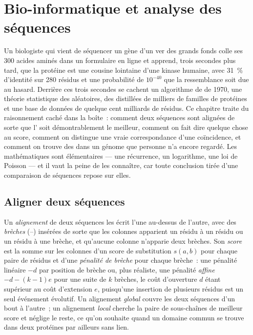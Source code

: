 \chapter{Bio-informatique et analyse des séquences}\label{ch:b3:bioinformatics}

Un biologiste qui vient de séquencer un gène d'un ver des grands fonds
colle ses \num{300} acides aminés dans un formulaire en ligne et
apprend, trois secondes plus tard, que la protéine est une cousine
lointaine d'une kinase humaine, avec \qty{31}{\%} d'identité sur
\num{280} résidus et une probabilité de $10^{-40}$ que la ressemblance
soit due au hasard. Derrière ces trois secondes se cachent un
algorithme de  de 1970, une théorie statistique
des  aléatoires, des  distillées de
milliers de familles de protéines et une base de données de quelque
cent milliards de résidus. Ce chapitre traite du raisonnement caché
dans la boîte~: comment deux séquences sont alignées de sorte que
l' soit démontrablement le meilleur, comment on fait dire
quelque chose au score, comment on distingue une vraie correspondance
d'une coïncidence, et comment on trouve des  dans un génome que
personne n'a encore regardé. Les mathématiques sont élémentaires ---
une récurrence, un logarithme, une loi de Poisson --- et il vaut la
peine de les connaître, car toute conclusion tirée d'une comparaison de
séquences repose sur elles.

\section{Aligner deux séquences}

\begin{definition}\label{def:b3:bioinformatics:alignment}
Un \emph{alignement} de deux séquences les écrit l'une au-dessus de
l'autre, avec des \emph{brèches} (--) insérées de sorte que les
colonnes apparient un résidu à un résidu ou un résidu à une brèche, et
qu'aucune colonne n'apparie deux brèches. Son \emph{score} est la somme
sur les colonnes d'un score de substitution $s(a,b)$ pour chaque paire
de résidus et d'une \emph{pénalité de brèche} pour chaque brèche~: une
pénalité linéaire $-d$ par position de brèche ou, plus réaliste, une
pénalité \emph{affine} $-d - (k-1)e$ pour une suite de $k$ brèches, le
coût d'ouverture $d$ étant supérieur au coût d'extension $e$, puisqu'une
insertion de plusieurs résidus est un seul événement évolutif. Un
alignement \emph{global} couvre les deux séquences d'un bout à
l'autre~; un alignement \emph{local} cherche la paire de sous-chaînes
de meilleur score et néglige le reste, ce qu'on souhaite quand un
domaine commun se trouve dans deux protéines par ailleurs sans lien.
\end{definition}

